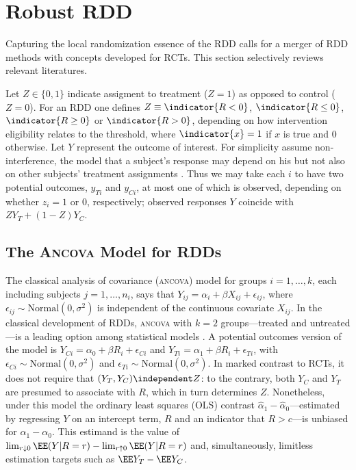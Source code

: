 \section{Robust RDD}
Capturing the local randomization essence of the RDD calls for
a merger of RDD methods with concepts developed for RCTs. This
section selectively reviews relevant literatures.

Let $Z \in \{0,1\}$ indicate assigment to treatment ($Z=1$) as opposed to control
($Z=0$).  For an RDD one defines $Z \equiv \indicator{R< 0}$,
$\indicator{R \leq 0}$, $\indicator{R\geq 0}$ or $\indicator{R > 0}$,
depending on how intervention eligibility relates to the threshold,
where $\indicator{x}=1$ if $x$ is true and $0$ otherwise.
Let $Y$ represent the outcome of interest.
For simplicity assume non-interference, the model that
a subject's response may depend on his but not also on other subjects'
treatment assignments \citep{cox:1958,rubin:1978}.  Thus we may take each $i$
to have two potential outcomes, $y_{Ti}$ and $y_{Ci}$, at most one of which is observed, depending on whether $z_i=1$ or $0$, respectively;
 observed
responses $Y$ coincide with $ZY_{T}+(1-Z)Y_{C}$.


\subsection{The \textsc{Ancova} Model for RDDs}\label{sec:robust-analys-covar}

The classical analysis of covariance (\textsc{ancova}) model for
groups $i=1,\ldots, k$, each including subjects $j=1, \ldots, n_{i}$,
says that
$Y_{ij} = \alpha_{i} + \beta X_{ij} + \epsilon_{ij}$, where $\epsilon_{ij}
\sim \mathrm{Normal}(0, \sigma^{2})$ is independent of the continuous
covariate $X_{ij}$.
In the classical development of RDDs, \textsc{ancova} with $k=2$
groups---treated and untreated---is a leading option among statistical
models
\citep{thistlethwaite1960regression}.
A potential outcomes version of the model is
 $Y_{Ci} = \alpha_{0} + \beta R_{i} + \epsilon_{Ci}$ and
$Y_{Ti} = \alpha_{1}  + \beta R_{i} + \epsilon_{Ti}$, with
 $\epsilon_{Ci} \sim \mathrm{Normal}(0, \sigma^{2})$ and
 $\epsilon_{Ti} \sim \mathrm{Normal}(0, \sigma^{2})$.
In marked contrast to RCTs, it does
not require that $(Y_{T}, Y_{C}) \independent Z$: to the contrary, both
$Y_{C}$ and $Y_{T}$ are presumed to associate with $R$, which in turn
determines $Z$. 
Nonetheless, under this model the ordinary least squares
(OLS) contrast $\hat{\alpha}_{1} - \hat{\alpha}_{0}$---estimated by
regressing $Y$ on an intercept term, $R$ and an indicator that $R>c$---is unbiased for
$\alpha_{1} - \alpha_{0}$. 
This estimand is the value of  $\lim_{r\downarrow 0} \EE(Y | R=r) -
\lim_{r\uparrow 0} \EE(Y | R=r)$ and, simultaneously,
limitless estimation targets such as $\EE Y_{T}  - \EE Y_{C}$.

